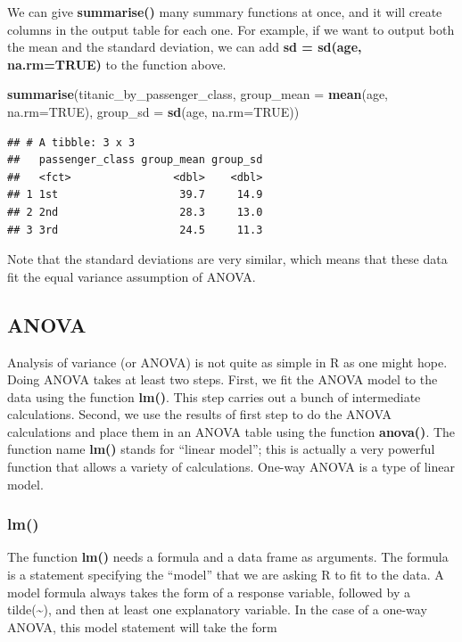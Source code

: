 \documentclass[
]{article}
\newenvironment{Shaded}{\begin{snugshade}}{\end{snugshade}}
\newcommand{\AttributeTok}[1]{\textcolor[rgb]{0.13,0.29,0.53}{#1}}
\newcommand{\ConstantTok}[1]{\textcolor[rgb]{0.56,0.35,0.01}{#1}}
\newcommand{\FunctionTok}[1]{\textcolor[rgb]{0.13,0.29,0.53}{\textbf{#1}}}
\newcommand{\NormalTok}[1]{#1}
\begin{document}
We can give \textbf{summarise()} many summary functions at once, and it
will create columns in the output table for each one. For example, if we
want to output both the mean and the standard deviation, we can add
\textbf{sd = sd(age, na.rm=TRUE)} to the function above.

\begin{Shaded}
\begin{Highlighting}[]
\FunctionTok{summarise}\NormalTok{(titanic\_by\_passenger\_class, }\AttributeTok{group\_mean =} \FunctionTok{mean}\NormalTok{(age, }\AttributeTok{na.rm=}\ConstantTok{TRUE}\NormalTok{), }\AttributeTok{group\_sd =} \FunctionTok{sd}\NormalTok{(age, }\AttributeTok{na.rm=}\ConstantTok{TRUE}\NormalTok{))}
\end{Highlighting}
\end{Shaded}

\begin{verbatim}
## # A tibble: 3 x 3
##   passenger_class group_mean group_sd
##   <fct>                <dbl>    <dbl>
## 1 1st                   39.7     14.9
## 2 2nd                   28.3     13.0
## 3 3rd                   24.5     11.3
\end{verbatim}

Note that the standard deviations are very similar, which means that
these data fit the equal variance assumption of ANOVA.

\subsection{ANOVA}\label{anova}

Analysis of variance (or ANOVA) is not quite as simple in R as one might
hope. Doing ANOVA takes at least two steps. First, we fit the ANOVA
model to the data using the function \textbf{lm()}. This step carries
out a bunch of intermediate calculations. Second, we use the results of
first step to do the ANOVA calculations and place them in an ANOVA table
using the function \textbf{anova()}. The function name \textbf{lm()}
stands for ``linear model''; this is actually a very powerful function
that allows a variety of calculations. One-way ANOVA is a type of linear
model.

\subsubsection{lm()}\label{lm}

The function \textbf{lm()} needs a formula and a data frame as
arguments. The formula is a statement specifying the ``model'' that we
are asking R to fit to the data. A model formula always takes the form
of a response variable, followed by a tilde(\textbf{\textasciitilde{}}),
and then at least one explanatory variable. In the case of a one-way
ANOVA, this model statement will take the form
\end{document}
